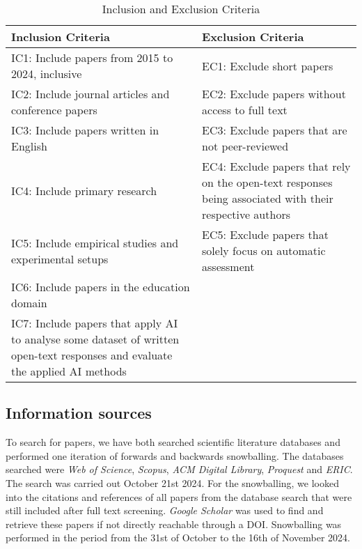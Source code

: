 \begin{table}[h!]
\centering
\caption{Inclusion and Exclusion Criteria}
\label{tab:eligibilitycriteria}
\begin{tabularx}{\textwidth}{|X|X|}
\hline
\textbf{Inclusion Criteria} & \textbf{Exclusion Criteria} \\
\hline
IC1: Include papers from 2015 to 2024, inclusive & EC1: Exclude short papers \\
\hline
IC2: Include journal articles and conference papers & EC2: Exclude papers without access to full text \\
\hline
IC3: Include papers written in English & EC3: Exclude papers that are not peer-reviewed \\
\hline
IC4: Include primary research & EC4: Exclude papers that rely on the open-text responses being associated with their respective authors \\
\hline
IC5: Include empirical studies and experimental setups & EC5: Exclude papers that solely focus on automatic assessment \\
\hline
IC6: Include papers in the education domain & \\
\hline
IC7: Include papers that apply AI to analyse some dataset of written open-text responses and evaluate the applied AI methods & \\
\hline
\end{tabularx}
\end{table}

\subsection{Information sources}
To search for papers, we have both searched scientific literature databases and performed one iteration of forwards and backwards snowballing. The databases searched were \textit{Web of Science}, \textit{Scopus}, \textit{ACM Digital Library}, \textit{Proquest} and \textit{ERIC}. The search was carried out October 21st 2024. For the snowballing, we looked into the citations and references of all papers from the database search that were still included after full text screening. \textit{Google Scholar} was used to find and retrieve these papers if not directly reachable through a DOI. Snowballing was performed in the period from the 31st of October to the 16th of November 2024.

